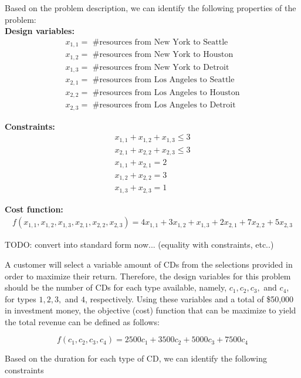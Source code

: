 \documentclass[11pt]{article}
\begin{document}
\begin{prob}{2}
\end{prob}
\begin{sol} 

Based on the problem description, we can identify the following properties of the problem: \\

\textbf{Design variables:}\\ 
\begin{eqnarray*}
x_{1,1} = \text{ \#resources from New York to Seattle}\\
x_{1,2} = \text{ \#resources from New York to Houston} \\
x_{1,3} = \text{ \#resources from New York to Detroit} \\
x_{2,1} = \text{ \#resources from Los Angeles to Seattle} \\
x_{2,2} = \text{ \#resources from Los Angeles to Houston} \\
x_{2,3} = \text{ \#resources from Los Angeles to Detroit}
\end{eqnarray*}

\textbf{Constraints:} \\
\begin{eqnarray*}
x_{1,1} + x_{1,2} + x_{1,3} \leq 3 \\
x_{2,1} + x_{2,2} + x_{2,3} \leq 3 \\
x_{1,1} + x_{2,1} = 2 \\
x_{1,2} + x_{2,2} = 3 \\
x_{1,3} + x_{2,3} = 1 
\end{eqnarray*}

\textbf{Cost function:}
\begin{eqnarray*}
f(x_{1,1},x_{1,2},x_{1,3},x_{2,1},x_{2,2},x_{2,3}) = 4x_{1,1} + 3x_{1,2} + x_{1,3} + 2x_{2,1} + 7x_{2,2} + 5x_{2,3}
\end{eqnarray*}

TODO: convert into standard form now... (equality with constraints, etc..)

\end{sol}

\begin{prob}{3}
\end{prob}
\begin{sol} 
A customer will select a variable amount of CDs from the selections provided in order to maximize their return. Therefore, the design variables for this problem should be the number of CDs for each type available, namely, $c_{1}, c_{2}, c_{3},$ and $c_{4}$, for types $1, 2, 3,$ and $4$, respectively. Using these variables and a total of \$50,000 in investment money, the objective (cost) function that can be maximize to yield the total revenue can be defined as follows:

\begin{equation*}
f(c_{1}, c_{2}, c_{3}, c_{4}) = 2500c_{1} + 3500c_{2} + 5000c_{3} + 7500c_{4}
\end{equation*}

Based on the duration for each type of CD, we can identify the following constraints 

\end{sol}
\end{document}
